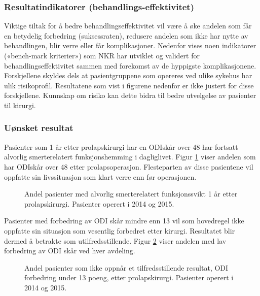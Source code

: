 \documentclass [norsk,a4paper,twoside]{article}\usepackage[]{graphicx}\usepackage[]{color}
\begin{document}
\subsubsection{Resultatindikatorer (behandlings-effektivitet)}

Viktige tiltak for å bedre behandlingseffektivitet vil være å øke andelen som får en
betydelig forbedring (suksessraten), redusere andelen som ikke har nytte av
behandlingen, blir verre eller får komplikasjoner. Nedenfor vises noen indikatorer
(«bench-mark kriterier») som NKR har utviklet og validert for
behandlingseffektivitet sammen med forekomst av de hyppigste komplikasjonene.
Forskjellene skyldes dels at pasientgruppene som opereres ved ulike sykehus har
ulik risikoprofil. Resultatene som vist i figurene nedenfor er ikke justert for disse
forskjellene. Kunnskap om risiko kan dette bidra til bedre utvelgelse av pasienter til
kirurgi.





\subsubsection{Uønsket resultat}

Pasienter som 1 år etter prolapskirurgi har en ODIskår over 48 har fortsatt alvorlig
smerterelatert funksjonshemming i dagliglivet. 
Figur \ref{fig:Osw48} viser andelen som har ODIskår over 48 etter prolapsoperasjon. 
Flesteparten av disse pasientene vil
oppfatte sin livssituasjon som klart verre enn før operasjonen. 

\begin{figure}[ht]
\caption{\label{fig:Osw48}  Andel pasienter med alvorlig smerterelatert funksjonssvikt 1 år etter
prolapskirurgi. Pasienter operert i 2014 og 2015.}
\end{figure}



Pasienter med forbedring av ODI skår mindre enn 13 vil som hovedregel ikke
oppfatte sin situasjon som vesentlig forbedret etter kirurgi. Resultatet blir dermed å
betrakte som utilfredsstillende. Figur \ref{fig:OswEndrLav} viser andelen med lav forbedring av 
ODI skår ved hver avdeling.

\begin{figure}[ht]
\caption{\label{fig:OswEndrLav}   Andel pasienter som ikke oppnår et tilfredsstillende resultat, ODI
forbedring under 13 poeng, etter prolapskirurgi. Pasienter operert i 2014 og 2015.}
\end{figure}
\end{document}
